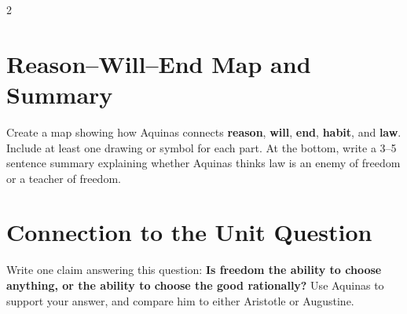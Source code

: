 \documentclass[12pt]{article}
\begin{document}
\begin{multicols}{2}
\section*{Reason--Will--End Map and Summary}
Create a map showing how Aquinas connects \textbf{reason}, \textbf{will}, \textbf{end}, \textbf{habit}, and \textbf{law}. Include at least one drawing or symbol for each part. At the bottom, write a 3--5 sentence summary explaining whether Aquinas thinks law is an enemy of freedom or a teacher of freedom.

\section*{Connection to the Unit Question}
Write one claim answering this question: \textbf{Is freedom the ability to choose anything, or the ability to choose the good rationally?} Use Aquinas to support your answer, and compare him to either Aristotle or Augustine.
\end{multicols}
\end{document}
